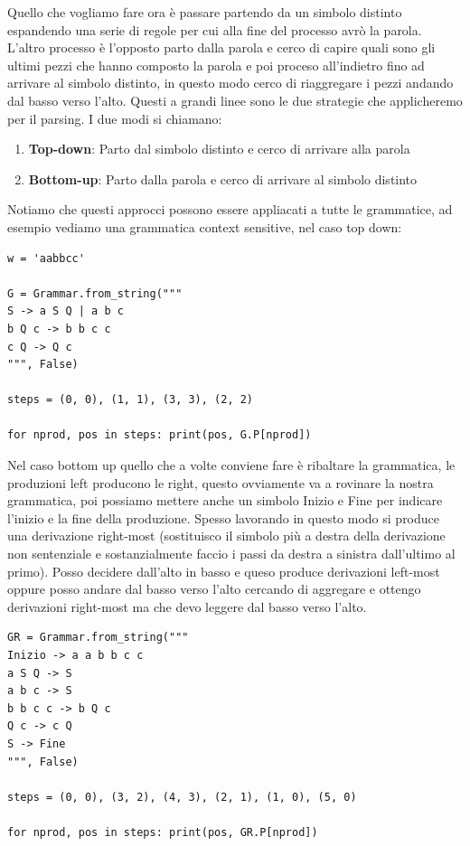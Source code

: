 Quello che vogliamo fare ora è passare partendo da un simbolo distinto espandendo una serie di regole per cui alla fine del processo avrò la parola.
L'altro processo è l'opposto parto dalla parola e cerco di capire quali sono gli ultimi pezzi che hanno composto la parola e poi proceso all'indietro fino ad arrivare al simbolo distinto, in questo modo cerco di riaggregare i pezzi andando dal basso verso l'alto.
Questi a grandi linee sono le due strategie che applicheremo per il parsing. I due modi si chiamano:
\begin{enumerate}
    \item \textbf{Top-down}: Parto dal simbolo distinto e cerco di arrivare alla parola
    \item \textbf{Bottom-up}: Parto dalla parola e cerco di arrivare al simbolo distinto
\end{enumerate}

Notiamo che questi approcci possono essere appliacati a tutte le grammatice, ad esempio vediamo una grammatica context sensitive, nel caso top down:
\begin{lstlisting}
w = 'aabbcc'

G = Grammar.from_string("""
S -> a S Q | a b c
b Q c -> b b c c  
c Q -> Q c
""", False)

steps = (0, 0), (1, 1), (3, 3), (2, 2)

for nprod, pos in steps: print(pos, G.P[nprod])

\end{lstlisting}

Nel caso bottom up quello che a volte conviene fare è ribaltare la grammatica, le produzioni left producono le right, questo ovviamente va a rovinare la nostra grammatica, poi possiamo mettere anche un simbolo Inizio e Fine per indicare l'inizio e la fine della produzione. Spesso lavorando in questo modo si produce una derivazione right-most (sostituisco il simbolo più a destra della derivazione non sentenziale e sostanzialmente faccio i passi da destra a sinistra dall'ultimo al primo). Posso decidere dall'alto in basso e queso produce derivazioni left-most oppure posso andare dal basso verso l'alto cercando di aggregare e ottengo derivazioni right-most ma che devo leggere dal basso verso l'alto.

\begin{lstlisting}
GR = Grammar.from_string("""
Inizio -> a a b b c c
a S Q -> S
a b c -> S 
b b c c -> b Q c
Q c -> c Q
S -> Fine
""", False)

steps = (0, 0), (3, 2), (4, 3), (2, 1), (1, 0), (5, 0)

for nprod, pos in steps: print(pos, GR.P[nprod])
\end{lstlisting}

